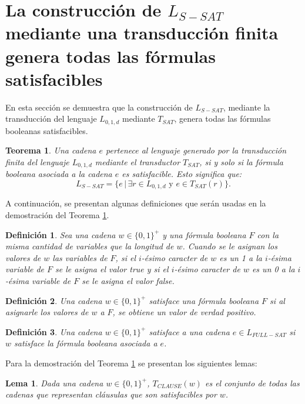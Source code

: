 \documentclass[12pt]{article}
\newtheorem{theorem}{Teorema}
\newtheorem{lemma}{Lema}
\newtheorem{definition}{Definición}
\newcommand{\true}{\textit{true}}
\newcommand{\false}{\textit{false}}
\begin{document}
\section{La construcción de $L_{S-SAT}$ mediante una transducción finita
  genera todas las fórmulas satisfacibles}


En esta sección se demuestra que la construcción de $L_{S-SAT}$, mediante la transducción del lenguaje $L_{0,1,d}$ mediante $T_{SAT}$, genera todas las fórmulas booleanas satisfacibles.

\begin{theorem}
    \label{teo:tsat}
    Una cadena $e$ pertenece al lenguaje generado por la transducción finita del lenguaje $L_{0,1,d}$ mediante el transductor $T_{SAT}$, si y solo si la fórmula booleana asociada a la cadena $e$ es satisfacible. Esto significa que:
    $$L_{S-SAT} = \{e\,|\,\exists r \in L_{0,1,d} \text{ y } e \in T_{SAT}(r) \}.$$
\end{theorem}

A continuación, se presentan algunas definiciones que serán usadas en la demostración del Teorema \ref{teo:tsat}.


\begin{definition}
    Sea una cadena $w\in \{0,1\}^+$ y una fórmula booleana $F$ con la misma cantidad de variables que la longitud de 
    $w$. Cuando se le asignan los valores de $w$ las variables de $F$, si el $i$-ésimo caracter de $w$ es un 1 a la $i$-ésima variable de $F$ se le asigna
    el valor \true{} y si el $i$-ésimo caracter de $w$ es un 0 a la $i$-ésima variable de $F$ se le asigna
    el valor \false{}.
\end{definition}

\begin{definition}
    Una cadena  $w\in\{0,1\}^+$ satisface una fórmula booleana $F$ si al asignarle los valores de $w$ a $F$, se obtiene un valor de verdad positivo.
\end{definition}

\begin{definition}
    Una cadena $w\in\{0,1\}^+$ satisface a una cadena $e\in L_{FULL-SAT}$ si $w$ satisface la fórmula booleana asociada a $e$. 
\end{definition}

Para la demostración del Teorema \ref{teo:tsat} se presentan los siguientes lemas:

\begin{lemma}
    \label{lem:clause}
    Dada una cadena $w\in\{0,1\}^+$, $T_{CLAUSE}(w)$ es el conjunto de todas las cadenas que representan cláusulas que son satisfacibles por $w$.
\end{lemma}
\end{document}
